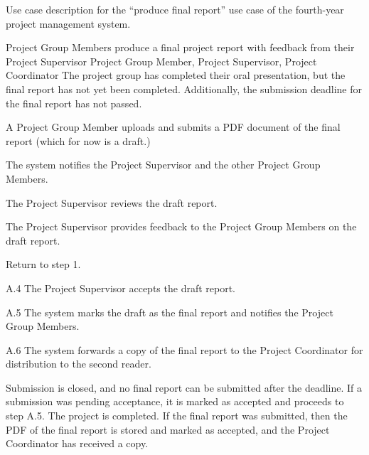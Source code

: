 \begin{table}
  \centering
  \caption{Use case description for the ``produce final report'' use case of the fourth-year project management system.}
  \label{tbl:use-case-final-report}

  \begin{usecase}
    Project Group Members produce a final project report with feedback from their Project Supervisor
    Project Group Member, Project Supervisor, Project Coordinator
    The project group has completed their oral presentation, but the final report has not yet been completed. Additionally, the submission deadline for the final report has not passed.
    \ucnormal
    \begin{ucenum}
      \item A Project Group Member uploads and submits a PDF document of the final report (which for now is a draft.)
      \item The system notifies the Project Supervisor and the other Project Group Members.
      \item The Project Supervisor reviews the draft report.
      \item The Project Supervisor provides feedback to the Project Group Members on the draft report.
      \item Return to step 1.
    \end{ucenum}
    \begin{ucenum}
      \item [A.4] The Project Supervisor accepts the draft report.
      \item [A.5] The system marks the draft as the final report and notifies the Project Group Members.
      \item [A.6] The system forwards a copy of the final report to the Project Coordinator for distribution to the second reader.
    \end{ucenum}
    Submission is closed, and no final report can be submitted after the deadline. If a submission was pending acceptance, it is marked as accepted and proceeds to step A.5.
    The project is completed. If the final report was submitted, then the PDF of the final report is stored and marked as accepted, and the Project Coordinator has received a copy.
  \end{usecase}
\end{table}


